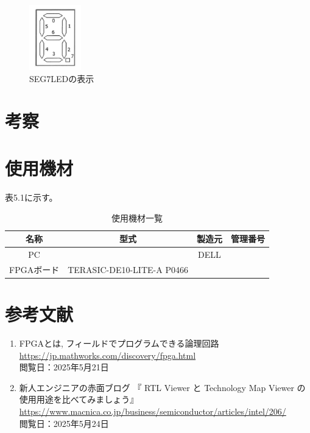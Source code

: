 \documentclass{jlreq}
\numberwithin{equation}{section}
\begin{document}
\begin{figure}[H]
  \centering
  \includegraphics[width=0.2\textwidth]{assets/SEG7LED.png}
  \caption{SEG7LEDの表示}
\end{figure}

\section{考察}

\section{使用機材}
表5.1に示す。
\begin{table}[H]
  \centering
  \caption{使用機材一覧}
  \begin{tabular}{|c|c|c|c|}
    \hline
    名称 & 型式 & 製造元 & 管理番号 \\ \hline
    PC & & DELL &  \\ \hline
    FPGAボード & TERASIC-DE10-LITE-A P0466 & & \\ \hline
  \end{tabular}
\end{table}

\section{参考文献}
\begin{enumerate}
  \item FPGAとは, フィールドでプログラムできる論理回路 \\
    \url{https://jp.mathworks.com/discovery/fpga.html}\\
    閲覧日：2025年5月21日
  \item 新人エンジニアの赤面ブログ 『 RTL Viewer と Technology Map Viewer の使用用途を比べてみましょう』\\
    \url{https://www.macnica.co.jp/business/semiconductor/articles/intel/206/}\\
    閲覧日：2025年5月24日
\end{enumerate}
\end{document}
